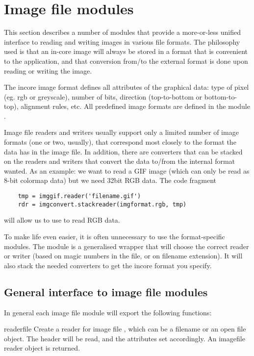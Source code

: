 \chapter{Image file modules}

This section describes a number of modules that provide a more-or-less
unified interface to reading and writing images in various file
formats.
The philosophy used is that an in-core image will always be stored in
a format that is convenient to the application, and that conversion from/to
the external format is done upon reading or writing the image.

The incore image format defines all attributes of the graphical data:
type of pixel (eg. rgb or greyscale), number of bits, direction
(top-to-bottom or bottom-to-top), alignment rules, etc. All predefined
image formats are defined in the module .

Image file readers and writers usually support only a limited number
of image formats (one or two, usually), that correspond most closely
to the format the data has in the image file. In addition, there are
converters that can be stacked on the readers and writers that convert
the data to/from the internal format wanted. As an example: we want to
read a GIF image (which can only be read as 8-bit colormap data) but
we need 32bit RGB data. The code fragment
\begin{verbatim}
    tmp = imggif.reader('filename.gif')
    rdr = imgconvert.stackreader(imgformat.rgb, tmp)
\end{verbatim}
will allow us to use  to read RGB data.

To make life even easier, it is often unnecessary to use the
format-specific modules. The  module is a generalised
wrapper that will choose the correct reader or writer (based on magic
numbers in the file, or on filename extension). It will also stack the
needed converters to get the incore format you specify.

\section{General interface to image file modules}
In general each image file module will export the following functions:

\begin{funcdesc}{reader}{file}
Create a reader for image file , which can be a filename or
an open file object. The header will be
read, and the attributes set accordingly. An imagefile reader object
is returned.
\end{funcdesc}

